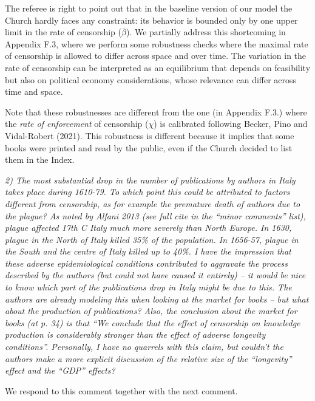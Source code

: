 \documentclass[12pt]{article}
\begin{document}
The referee is right to point out that in the baseline version of our model the Church hardly faces any constraint: its behavior is bounded only by one upper limit in the rate of censorship ($\overline{\beta}$). We partially address this shortcoming in Appendix F.3, where we perform some robustness checks where the maximal rate of censorship is allowed to differ across space and over time. The variation in the rate of censorship can be interpreted as an equilibrium that depends on feasibility but also on political economy considerations, whose relevance can differ across time and space.

Note that these robustnesses are different from the one (in Appendix F.3.) where the \textit{rate of enforcement} of censorship ($\chi$) is calibrated following Becker, Pino and Vidal-Robert (2021). This robustness is different because it implies that some books were printed and read by the public, even if the Church decided to list them in the Index.


\textit{
2) The most substantial drop in the number of publications by authors in Italy takes place during 1610-79. To which point this could be attributed to factors different from censorship, as for example the premature death of authors due to the plague? As noted by Alfani 2013 (see full cite in the “minor comments” list), plague affected 17th C Italy much more severely than North Europe. In 1630, plague in the North of Italy killed 35\% of the population. In 1656-57, plague in the South and the centre of Italy killed up to 40\%. I have the impression that these adverse epidemiological conditions contributed to aggravate the process described by the authors (but could not have caused it entirely) – it would be nice to know which part of the publications drop in Italy might be due to this. The authors are already modeling this when looking at the market for books – but what about the production of publications? Also, the conclusion about the market for books (at p. 34) is that “We conclude that the effect of censorship on knowledge production is considerably stronger than the effect of adverse longevity conditions”. Personally, I have no quarrels with this claim, but couldn’t the authors make a more explicit discussion of the relative size of the “longevity” effect and the “GDP” effects?
}

We respond to this comment together with the next comment.
\end{document}
